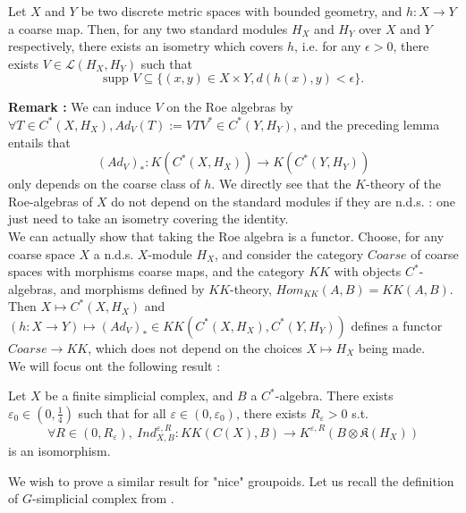 \begin{lem}
Let $X$ and $Y$ be two discrete metric spaces with bounded geometry, and $h : X\rightarrow Y$ a coarse map. Then, for any two standard modules $H_X$ and $H_Y$ over $X$ and $Y$ respectively, there exists an isometry which covers $h$, i.e. for any $\epsilon >0$, there exists $V\in \mathcal L(H_X,H_Y)$ such that 
\[\text{supp }V \subseteq \{(x,y)\in X\times Y, d(h(x),y)<\epsilon\}.\]
\end{lem}

\textbf{Remark :} We can induce $V$ on the Roe algebras by $\forall T\in C^*(X,H_X), Ad_V(T) := V T V^* \in C^*(Y,H_Y)$, and the preceding lemma entails that \[(Ad_V)_* : K(C^*(X,H_X))\rightarrow K(C^*(Y,H_Y))\] only depends on the coarse class of $h$. We directly see that the $K$-theory of the Roe-algebras of $X$ do not depend on the standard modules if they are n.d.s. : one just need to take an isometry covering the identity. \\

We can actually show that taking the Roe algebra is a functor. Choose, for any coarse space $X$ a n.d.s. $X$-module $H_X$, and consider the category $Coarse$ of coarse spaces with morphisms coarse maps, and the category $KK$ with objects $C^*$-algebras, and morphisms defined by $KK$-theory, $Hom_{KK}(A,B)=KK(A,B)$. Then $ X \mapsto C^*(X,H_X) $ and $\left(h:X \rightarrow Y\right) \mapsto (Ad_V)_*\in KK(C^*(X,H_X),C^*(Y,H_Y))$ defines a functor $Coarse \rightarrow KK$, which does not depend on the choices $X\mapsto H_X$ being made.\\

We will focus ont the following result :

\begin{thm}
Let $X$ be a finite simplicial complex, and $B$ a $C^*$-algebra. There exists $\varepsilon_0\in (0,\frac{1}{4})$ such that for all $\varepsilon \in (0,\varepsilon_0)$, there exists $R_\varepsilon>0 $ s.t. 
\[\forall R\in (0,R_\varepsilon),\  Ind_{X,B}^{\varepsilon, R} : KK(C(X),B)\rightarrow K^{\varepsilon,R}(B\otimes \mathfrak K(H_X))\] 
is an isomorphism.
\end{thm}

We wish to prove a similar result for "nice" groupoids. Let us recall the definition of $G$-simplicial complex from \cite{TuBC2}.

